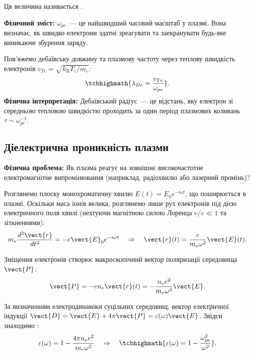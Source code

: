 Ця величина називається .

\textbf{Фізичний зміст:} $\omega_{pe}$~--- це найшвидший часовий масштаб у плазмі. Вона визначає, як швидко електрони здатні зреагувати та заекранувати будь-яке виникаюче збурення заряду.

Пов'яжемо дебаївську довжину та плазмову частоту через теплову швидкість електронів $v_{Te} = \sqrt{k_{\mathrm B}T_e / m_e}$:
\begin{equation}
	\tcbhighmath{\lambda_{De} = \frac{v_{Te}}{\omega_{pe}}}.
\end{equation}
\textbf{Фізична інтерпретація:} Дебаївський радіус~--- це відстань, яку електрон зі середньою тепловою швидкістю проходить за один період плазмових коливань $\tau \sim \omega_{pe}^{-1}$.

\subsection{Діелектрична проникність плазми}

\textbf{Фізична проблема:} Як плазма реагує на зовнішнє високочастотне електромагнітне випромінювання (наприклад, радіохвилю або лазерний промінь)?

Розглянемо плоску монохроматичну хвилю $E(t) = E_0 e^{-i\omega t}$, що поширюється в плазмі. Оскільки маса іонів велика, розглянемо лише рух електронів під дією електричного поля хвилі (нехтуючи магнітною силою Лоренца $v/c \ll 1$ та зіткненнями):
\begin{equation}
	m_e \frac{d^2 \vect{r}}{dt^2} = -e \vect{E}_0 e^{-i\omega t} \quad \Rightarrow \quad \vect{r}(t) = \frac{e}{m_e \omega^2}\vect{E}(t).
\end{equation}

Зміщення електронів створює макроскопічний вектор поляризації середовища $\vect{P}$:
\begin{equation}
	\vect{P} = -e n_e \vect{r}(t) = -\frac{n_e e^2}{m_e \omega^2}\vect{E}.
\end{equation}

За визначенням електродинаміки суцільних середовищ, вектор електричної індукції $\vect{D} = \vect{E} + 4\pi\vect{P} = \varepsilon(\omega)\vect{E}$. Звідси знаходимо :
\begin{equation}
	\varepsilon(\omega) = 1 - \frac{4\pi n_e e^2}{m_e \omega^2} \quad \Rightarrow \quad \tcbhighmath{\varepsilon(\omega) = 1 - \frac{\omega_{pe}^2}{\omega^2}}.
\end{equation}

